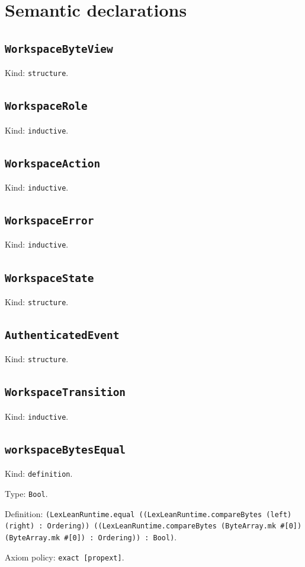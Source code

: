 \documentclass[11pt]{article}
\begin{document}
\section*{Semantic declarations}
\subsection*{\texttt{WorkspaceByteView}}
\noindent Kind: \texttt{structure}.\par
\subsection*{\texttt{WorkspaceRole}}
\noindent Kind: \texttt{inductive}.\par
\subsection*{\texttt{WorkspaceAction}}
\noindent Kind: \texttt{inductive}.\par
\subsection*{\texttt{WorkspaceError}}
\noindent Kind: \texttt{inductive}.\par
\subsection*{\texttt{WorkspaceState}}
\noindent Kind: \texttt{structure}.\par
\subsection*{\texttt{AuthenticatedEvent}}
\noindent Kind: \texttt{structure}.\par
\subsection*{\texttt{WorkspaceTransition}}
\noindent Kind: \texttt{inductive}.\par
\subsection*{\texttt{workspaceBytesEqual}}
\noindent Kind: \texttt{definition}.\par
\noindent Type: \texttt{Bool}.\par
\noindent Definition: \texttt{(LexLeanRuntime.equal ((LexLeanRuntime.compareBytes (left) (right) : Ordering)) ((LexLeanRuntime.compareBytes (ByteArray.mk \#[0]) (ByteArray.mk \#[0]) : Ordering)) : Bool)}.\par
\noindent Axiom policy: \texttt{exact [propext]}.\par
\end{document}

